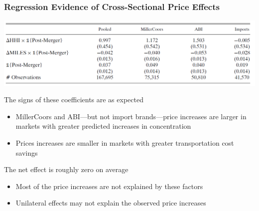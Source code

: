 \documentclass{beamer}
\begin{document}
\begin{frame}\frametitle{Regression Evidence of Cross-Sectional Price Effects}
    \begin{center}
        \includegraphics[width=0.95\linewidth]{table_3}
    \end{center}
    The signs of these coefficients are as expected
    \begin{itemize}
        \item MillerCoors and ABI---but not import brands---price increases are larger in markets with greater predicted increases in concentration
        \item Prices increases are smaller in markets with greater transportation cost savings
    \end{itemize}
    \vspace{2ex}
    The net effect is roughly zero on average
    \begin{itemize}
        \item Most of the price increases are not explained by these factors
        \item Unilateral effects may not explain the observed price increases
    \end{itemize}
\end{frame} 
\end{document}
